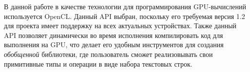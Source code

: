 В данной работе в качестве технологии для программирования GPU-вычислений используется OpenCL. Данный API выбран, поскольку его требуемая версия 1.2 для проекта имеет поддержку на всех актуальных устройствах. Также данный API позволяет динамически во время исполнения компилировать код для выполнения на GPU, что делает его удобным инструментов для создания \textit{обобщенной} библиотеки, где пользователь сможет реализовывать свои примитивные типы и операции в виде набора текстовых строк.


